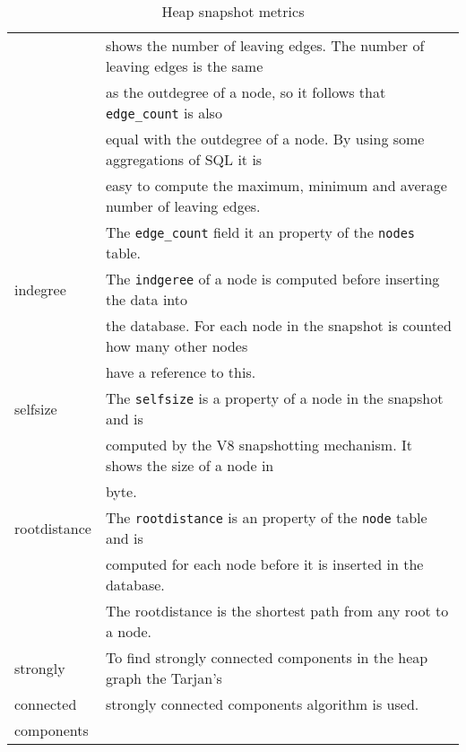 \begin{table}[!htbp]
\begin{tabular}{|l||l|}
						& shows the number of leaving edges. 
						  The number of leaving edges is the same 	\\
						& as the outdegree of a node, so it follows 
						  that \texttt{edge\_count} is also 		\\
						& equal with the outdegree of a node. By 
						  using some aggregations of SQL it is 		\\
						& easy to compute the maximum, minimum and 
						  average number of leaving edges. 			\\
						& The \texttt{edge\_count} field it an 
						  property of the \texttt{nodes} table.		\\ \hline
		indegree		& The \texttt{indgeree} of a node is 
						  computed before inserting the data into	\\
						& the database. For each node in the 
						  snapshot is counted how many other nodes	\\
						& have a reference to this.					\\ \hline
		selfsize		& The \texttt{selfsize} is a property of a 
						  node in the snapshot and is 				\\
						& computed by the V8 snapshotting mechanism. 
						   It shows the size of a node in			\\
						& byte.										\\ \hline 
		rootdistance	& The \texttt{rootdistance} is an property 
						  of the \texttt{node} table and is 		\\
						& computed for each node before it is 
						  inserted in the database. 				\\
						& The rootdistance is the shortest path from 
						   any root to a node.						\\ \hline
		strongly		& To find strongly connected components in 
						  the heap graph the Tarjan's 				\\ 
		connected		& strongly connected components
			 			  algorithm\cite{Trajan} is used.			\\
		components		&											\\ \hline
	\end{tabular}
	\caption{Heap snapshot metrics}
	\label{tap:heap_snapshot_metrics}
\end{table}